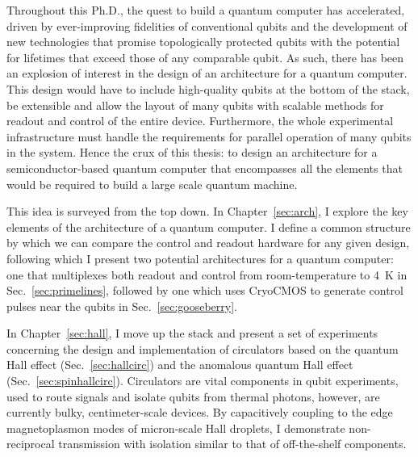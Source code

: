 %
%
%
Throughout this Ph.D., the quest to build a quantum computer has accelerated, driven by ever-improving fidelities of conventional qubits and the development of new technologies
that promise topologically protected qubits with the potential for lifetimes that exceed those of any comparable
qubit. As such, there has been an explosion of interest in the design of an architecture for a
quantum computer. This design would have to include high-quality qubits at the bottom of the stack, be extensible and allow the layout of many qubits with scalable methods for readout and control of the entire device. Furthermore, the whole experimental infrastructure must handle the requirements for parallel operation
of many qubits in the system. Hence the crux of this thesis: to design an architecture for a semiconductor-based quantum computer that encompasses all the elements that would be required to build a large scale quantum machine.

This idea is surveyed from the top down. In Chapter~\ref{sec:arch}, I explore the key elements of the architecture of a quantum computer. I define a common structure by which we can compare the control
and readout hardware for any given design, following which I present two potential architectures for
a quantum computer: one that multiplexes both readout and control from room-temperature to \SI{4}{\kelvin} in
Sec.~\ref{sec:primelines}, followed by one which uses {CryoCMOS} to generate control pulses near the qubits
in Sec.~\ref{sec:gooseberry}.

In Chapter~\ref{sec:hall}, I move up the stack and present a set of experiments concerning the design and
implementation of circulators based on the quantum Hall effect (Sec.~\ref{sec:hallcirc}) and the
anomalous quantum Hall effect (Sec.~\ref{sec:spinhallcirc}). Circulators are vital components in qubit
experiments, used to route signals and isolate qubits from thermal photons, however, are currently bulky,
centimeter-scale devices. By capacitively coupling to the edge magnetoplasmon modes of micron-scale Hall droplets,
I demonstrate non-reciprocal transmission with isolation similar to that of off-the-shelf components.

